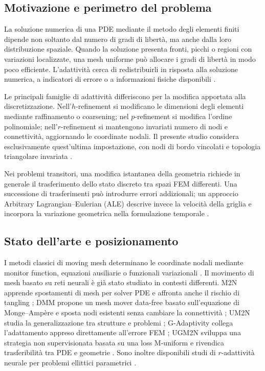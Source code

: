 \subsection{Motivazione e perimetro del problema}

La soluzione numerica di una PDE mediante il metodo degli elementi finiti dipende non soltanto dal numero di gradi di libertà, ma anche dalla loro distribuzione spaziale. Quando la soluzione presenta fronti, picchi o regioni con variazioni localizzate, una mesh uniforme può allocare i gradi di libertà in modo poco efficiente. L'adattività cerca di redistribuirli in risposta alla soluzione numerica, a indicatori di errore o a informazioni fisiche disponibili \citep{huang2011adaptive,bangerth2003adaptive,cao2001an}.

Le principali famiglie di adattività differiscono per la modifica apportata alla discretizzazione. Nell'$h$-refinement si modificano le dimensioni degli elementi mediante raffinamento o coarsening; nel $p$-refinement si modifica l'ordine polinomiale; nell'$r$-refinement si mantengono invariati numero di nodi e connettività, aggiornando le coordinate nodali. Il presente studio considera esclusivamente quest'ultima impostazione, con nodi di bordo vincolati e topologia triangolare invariata \citep{huang2001practical,huang2001variational,hyman1988moving}.

Nei problemi transitori, una modifica istantanea della geometria richiede in generale il trasferimento dello stato discreto tra spazi FEM differenti. Una successione di trasferimenti può introdurre errori addizionali; un approccio Arbitrary Lagrangian--Eulerian (ALE) descrive invece la velocità della griglia e incorpora la variazione geometrica nella formulazione temporale \citep{hirt1974an,donea2004arbitrary,farhat2001the}.

\subsection{Stato dell'arte e posizionamento}

I metodi classici di moving mesh determinano le coordinate nodali mediante monitor function, equazioni ausiliarie o funzionali variazionali \citep{cao2001an,huang2001practical,huang2001variational,huang1999moving,budd2009adaptivity}. Il movimento di mesh basato su reti neurali è già stato studiato in contesti differenti. M2N apprende spostamenti di mesh per solver PDE e affronta anche il rischio di tangling \citep{song2022m2n}; DMM propone un mesh mover data-free basato sull'equazione di Monge--Ampère e sposta nodi esistenti senza cambiare la connettività \citep{hu2024dmm}; UM2N studia la generalizzazione tra strutture e problemi \citep{zhang2024towards}; G-Adaptivity collega l'adattamento appreso direttamente all'errore FEM \citep{rowbottom2025gadaptivity}; UGM2N sviluppa una strategia non supervisionata basata su una loss M-uniform e rivendica trasferibilità tra PDE e geometrie \citep{wang2025ugm2n}. Sono inoltre disponibili studi di $r$-adattività neurale per problemi ellittici parametrici \citep{aballay2026radaptive}.

